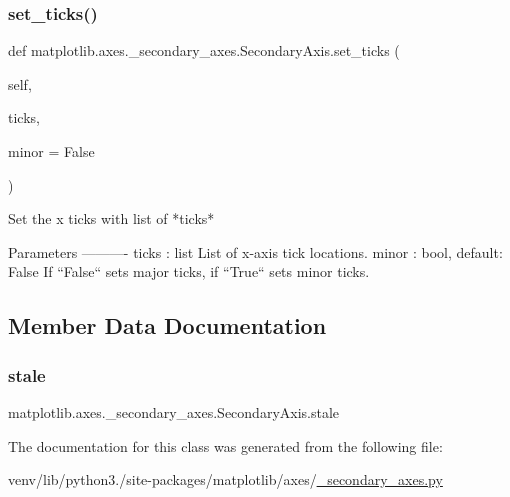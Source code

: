 \subsubsection{\texorpdfstring{set\+\_\+ticks()}{set\_ticks()}}
{\footnotesize\ttfamily def matplotlib.\+axes.\+\_\+secondary\+\_\+axes.\+Secondary\+Axis.\+set\+\_\+ticks (\begin{DoxyParamCaption}\item[{}]{self,  }\item[{}]{ticks,  }\item[{}]{minor = {\ttfamily False} }\end{DoxyParamCaption})}

\begin{DoxyVerb}Set the x ticks with list of *ticks*

Parameters
----------
ticks : list
    List of x-axis tick locations.
minor : bool, default: False
    If ``False`` sets major ticks, if ``True`` sets minor ticks.
\end{DoxyVerb}
 

\subsection{Member Data Documentation}
\mbox{\label{classmatplotlib_1_1axes_1_1__secondary__axes_1_1SecondaryAxis_ab4bd90fd336837cbeefc3f41ea90a30f}} 
\subsubsection{\texorpdfstring{stale}{stale}}
{\footnotesize\ttfamily matplotlib.\+axes.\+\_\+secondary\+\_\+axes.\+Secondary\+Axis.\+stale}



The documentation for this class was generated from the following file\+:\begin{DoxyCompactItemize}
\item 
venv/lib/python3./site-\/packages/matplotlib/axes/\hyperlink{__secondary__axes_8py}{\+\_\+secondary\+\_\+axes.\+py}\end{DoxyCompactItemize}
